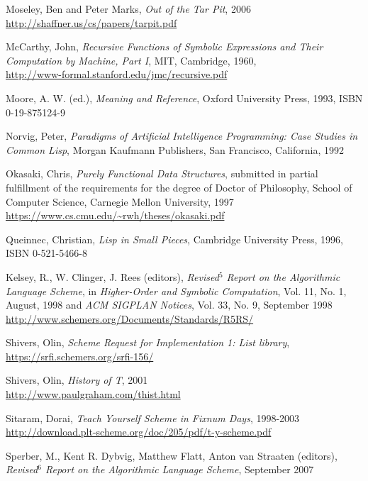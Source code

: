 \begin{thebibliography}{90}
  Moseley, Ben and Peter Marks, \emph{Out of the Tar Pit}, 2006 \\
  \url{http://shaffner.us/cs/papers/tarpit.pdf}

  McCarthy, John,
  \emph{Recursive Functions of Symbolic Expressions
    and Their Computation by Machine, Part I},
  MIT, Cambridge, 1960, \\
  \url{http://www-formal.stanford.edu/jmc/recursive.pdf}
  
  Moore, A. W. (ed.),
  \emph{Meaning and Reference},
  Oxford University Press, 1993,
  ISBN 0-19-875124-9

  Norvig, Peter, \emph{Paradigms of Artificial Intelligence Programming:
    Case Studies in Common Lisp}, Morgan Kaufmann Publishers, San Francisco,
  California, 1992
  
  Okasaki, Chris,
  \emph{Purely Functional Data Structures},
  submitted in partial fulfillment of the requirements
  for the degree of Doctor of Philosophy, School of
  Computer Science, Carnegie Mellon University, 1997 \\
  \url{https://www.cs.cmu.edu/~rwh/theses/okasaki.pdf}

  Queinnec, Christian, \emph{Lisp in Small Pieces},
  Cambridge University Press, 1996,
  ISBN 0-521-5466-8
  
  Kelsey, R., W. Clinger, J. Rees (editors),
  \emph{Revised$^5$ Report on the Algorithmic Language Scheme},
  in \emph{Higher-Order and Symbolic Computation}, Vol. 11, No. 1,
  August, 1998 and \emph{ACM SIGPLAN Notices}, Vol. 33, No. 9,
  September 1998 \\
  \url{http://www.schemers.org/Documents/Standards/R5RS/}

  Shivers, Olin, \emph{Scheme Request for Implementation 1: List library}, \\
  \url{https://srfi.schemers.org/srfi-156/}
  
  Shivers, Olin, \emph{History of T}, 2001 \\
  \url{http://www.paulgraham.com/thist.html}

  Sitaram, Dorai, \emph{Teach Yourself Scheme in Fixnum Days}, 1998-2003 \\
  \url{http://download.plt-scheme.org/doc/205/pdf/t-y-scheme.pdf}
  
  Sperber, M., Kent R. Dybvig, Matthew Flatt, Anton van Straaten (editors),
  \emph{Revised$^6$ Report on the Algorithmic Language Scheme},
  September 2007 \\
  

\end{thebibliography}
